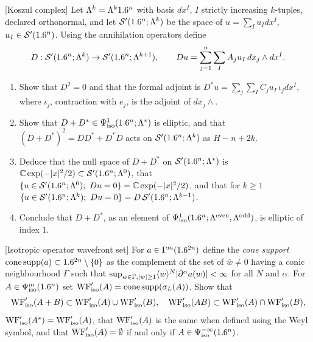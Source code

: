 \begin{exercise}\label{isotropic:ex:koszul}
[Koszul complex] Let $\Lambda^k=\Lambda^k1.6^n$ with basis $dx^I$, $I$ strictly
increasing $k$-tuples, declared orthonormal, and let $\mathcal{S}'(1.6^n;\Lambda^k)$ be
the space of $u=\sum_Iu_Idx^I$, $u_I\in\mathcal{S}'(1.6^n)$. Using the annihilation
operators define
\begin{equation*}
  D:\mathcal{S}'(1.6^n;\Lambda^k)\to\mathcal{S}'(1.6^n;\Lambda^{k+1}),\qquad Du=\sum_{j=1}^n\sum_IA_ju_I\,dx_j\wedge dx^I .
\end{equation*}
\begin{enumerate}[label=(\alph*)]
\item Show that $D^2=0$ and that the formal adjoint is
  $D^*u=\sum_j\sum_IC_ju_I\,\iota_jdx^I$, where $\iota_j$, contraction with $e_j$,
  is the adjoint of $dx_j\wedge$.
\item Show that $D+D^*\in\Psi^{1}_{\mathrm{iso}}(1.6^n;\Lambda^*)$ is elliptic, and that
  $(D+D^*)^2=DD^*+D^*D$ acts on $\mathcal{S}'(1.6^n;\Lambda^k)$ as $H-n+2k$.
\item Deduce that the null space of $D+D^*$ on $\mathcal{S}'(1.6^n;\Lambda^*)$ is
  $\mathbb{C}\exp(-|x|^2/2)\subset\mathcal{S}'(1.6^n;\Lambda^0)$, that
  $\{u\in\cSp(\R^n;\Lambda^0);\ Du=0\}=\C\exp(-|x|^2/2)$, and that for $k\ge1$
  $\{u\in\cSp(\R^n;\Lambda^k);\ Du=0\}=D\,\cSp(\R^n;\Lambda^{k-1})$.
\item Conclude that $D+D^*$, as an element of
  $\Psi^{1}_{\mathrm{iso}}(1.6^n;\Lambda^{\mathrm{even}},\Lambda^{\mathrm{odd}})$, is elliptic of index $1$.
\end{enumerate}
\end{exercise}

\begin{exercise}\label{isotropic:ex:WF-operator}
[Isotropic operator wavefront set] For $a\in\Gamma^{m}(1.6^{2n})$ define the
\emph{cone support} $\operatorname{cone\,supp}(a)\subset1.6^{2n}\setminus\{0\}$ as
the complement of the set of $\bar w\ne0$ having a conic neighbourhood
$\Gamma$ such that $\sup_{w\in\Gamma,|w|\ge1}\langle w\rangle^N|\partial^\alpha a(w)|<\infty$ for
all $N$ and $\alpha$. For $A\in\Psi^{m}_{\mathrm{iso}}(1.6^n)$ set
$\operatorname{WF}'_{\mathrm{iso}}(A)=\operatorname{cone\,supp}(\sigma_L(A))$. Show that
\begin{equation*}
  \operatorname{WF}'_{\mathrm{iso}}(A+B)\subset\operatorname{WF}'_{\mathrm{iso}}(A)\cup\operatorname{WF}'_{\mathrm{iso}}(B),\quad
  \operatorname{WF}'_{\mathrm{iso}}(AB)\subset\operatorname{WF}'_{\mathrm{iso}}(A)\cap\operatorname{WF}'_{\mathrm{iso}}(B),
\end{equation*}
$\operatorname{WF}'_{\mathrm{iso}}(A^*)=\operatorname{WF}'_{\mathrm{iso}}(A)$, that $\operatorname{WF}'_{\mathrm{iso}}(A)$ is the
same when defined using the Weyl symbol, and that
$\operatorname{WF}'_{\mathrm{iso}}(A)=\emptyset$ if and only if $A\in\Psi^{-\infty}_{\mathrm{iso}}(1.6^n)$.
\end{exercise}

